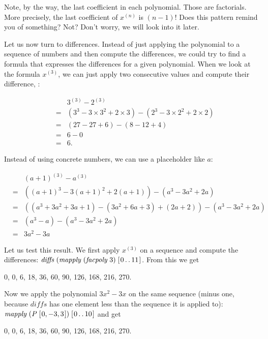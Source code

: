 \documentclass[tikz]{scrreprt}
\newcommand{\Conid}[1]{\mathit{#1}}
\newcommand{\Varid}[1]{\mathit{#1}}
\begin{document}
Note, by the way, the last coefficient in each polynomial.
Those are factorials. More precisely, the last coefficient
of $x^{(n)}$ is $(n-1)!$
Does this pattern remind you of something?
Not? Don't worry, we will look into it later.

Let us now turn to differences.
Instead of just applying the polynomial to a sequence
of numbers and then compute the differences,
we could try to find a formula that expresses
the differences for a given polynomial.
When we look at the formula $x^{(3)}$,
we can just apply two consecutive values
and compute their difference, \eg:

\begin{align*}
&   & 3^{(3)} - 2^{(3)} \\
& = & (3^3 - 3\times 3^2 + 2\times 3) -
    (2^3 - 3\times 2^2 + 2\times 2)\\
& = & (27 - 27 + 6) - (8 - 12 + 4) \\
& = & 6 - 0\\
& = & 6.
\end{align*}

Instead of using concrete numbers, we can use
a placeholder like $a$:

\begin{align*}
&   & (a+1)^{(3)} - a^{(3)}\\
& = & ((a+1)^3 - 3(a+1)^2 + 2(a+1)) -
      (a^3 - 3a^2 + 2a)\\
& = & ((a^3 +3a^2 + 3a + 1) - (3a^2+6a+3) + (2a+2)) - 
      (a^3 - 3a^2 + 2a)\\
& = & (a^3 - a) - 
      (a^3 - 3a^2 + 2a)\\
& = & 3a^2 - 3a
\end{align*}

Let us test this result.
We first apply $x^{(3)}$ on a sequence
and compute the differences:
\ensuremath{\Varid{diffs}\;(\Varid{mapply}\;(\Varid{facpoly}\;\mathrm{3})\;[\mskip1.5mu \mathrm{0}\mathinner{\ldotp\ldotp}\mathrm{11}\mskip1.5mu]}.
From this we get

0, 0, 6, 18, 36, 60, 90, 126, 168, 216, 270.

Now we apply the polynomial $3x^2 - 3x$
on the same sequence (minus one,
because \ensuremath{\Varid{diffs}} has one element less
than the sequence it is applied to): 
\ensuremath{\Varid{mapply}\;(\Conid{P}\;[\mskip1.5mu \mathrm{0},\mathbin{-}\mathrm{3},\mathrm{3}\mskip1.5mu])\;[\mskip1.5mu \mathrm{0}\mathinner{\ldotp\ldotp}\mathrm{10}\mskip1.5mu]}
and get

0, 0, 6, 18, 36, 60, 90, 126, 168, 216, 270.
\end{document}
